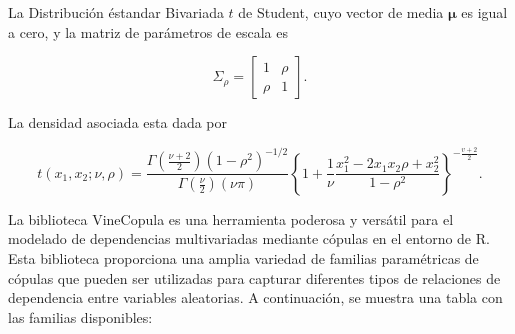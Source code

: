 \begin{ejemplo} La Distribución éstandar Bivariada $t$ de Student, cuyo vector de media $\boldsymbol{\mu}$ es igual a cero, y la matriz de parámetros de escala es

\begin{equation}
    \Sigma_\rho=\left[\begin{array}{ll}
    1 & \rho \\
    \rho & 1
    \end{array}\right] .
\end{equation}

La densidad asociada esta dada por

\begin{equation}
    t\left(x_1, x_2 ; \nu, \rho\right)=\frac{\Gamma\left(\frac{\nu+2}{2}\right)\left(1-\rho^2\right)^{-1 / 2}}{\Gamma\left(\frac{\nu}{2}\right)(\nu \pi)}\left\{1+\frac{1}{\nu} \frac{x_1^2-2 x_1 x_2 \rho+x_2^2}{1-\rho^2}\right\}^{-\frac{v+2}{2}} .
\end{equation}
\end{ejemplo}

La biblioteca VineCopula es una herramienta poderosa y versátil para el modelado de dependencias multivariadas mediante cópulas en el entorno de R. Esta biblioteca proporciona una amplia variedad de familias paramétricas de cópulas que pueden ser utilizadas para capturar diferentes tipos de relaciones de dependencia entre variables aleatorias. A continuación, se muestra una tabla con las familias disponibles:

